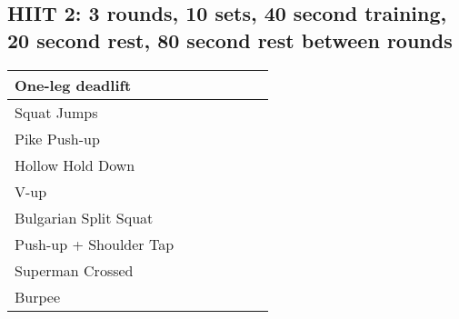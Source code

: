 \documentclass{article}
\begin{document}
\begin{landscape}
\section*{HIIT 2:  3 rounds, 10 sets, 40 second training, 20 second rest, 80 second rest between rounds}

\noindent\begin{tabularx}{\columnwidth}{ |l|*{6}{R|} }
  \hline
  One-leg deadlift                 &&&&&&    \\
  \hline                                        
  Squat Jumps                      &&&&&&    \\
  \hline                                        
  Pike Push-up                     &&&&&&    \\
  \hline                                        
  Hollow Hold Down                 &&&&&&    \\
  \hline                                        
  V-up                             &&&&&&    \\
  \hline                                        
  Bulgarian Split Squat            &&&&&&    \\
  \hline                                        
  Push-up + Shoulder Tap           &&&&&&    \\
  \hline                                        
  Superman Crossed                 &&&&&&    \\
  \hline                                        
  Burpee                           &&&&&&    \\
  \hline
\end{tabularx}

\end{landscape}
\end{document}
